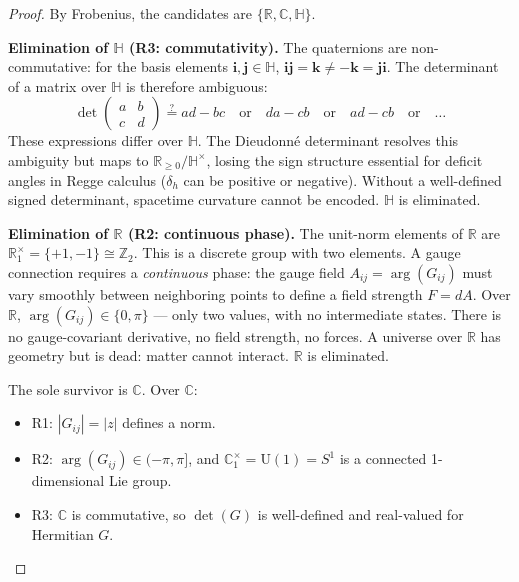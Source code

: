 \documentclass[12pt]{article}
\theoremstyle{remark}
\theoremstyle{definition}
\begin{document}
\begin{proof}
By Frobenius, the candidates are $\{\mathbb{R}, \mathbb{C}, \mathbb{H}\}$.

\medskip
\noindent\textbf{Elimination of $\mathbb{H}$ (R3: commutativity).}
The quaternions are non-commutative: for the basis elements $\mathbf{i}, \mathbf{j} \in \mathbb{H}$, $\mathbf{i}\mathbf{j} = \mathbf{k} \neq -\mathbf{k} = \mathbf{j}\mathbf{i}$. The determinant of a matrix over $\mathbb{H}$ is therefore ambiguous:
\begin{equation}
\det\begin{pmatrix} a & b \\ c & d \end{pmatrix} \stackrel{?}{=} ad - bc \quad\text{or}\quad da - cb \quad\text{or}\quad ad - cb \quad\text{or}\quad \ldots
\end{equation}
These expressions differ over $\mathbb{H}$. The Dieudonn\'e determinant resolves this ambiguity but maps to $\mathbb{R}_{\geq 0}/\mathbb{H}^\times$, losing the sign structure essential for deficit angles in Regge calculus ($\delta_h$ can be positive or negative). Without a well-defined signed determinant, spacetime curvature cannot be encoded. $\mathbb{H}$ is eliminated.

\medskip
\noindent\textbf{Elimination of $\mathbb{R}$ (R2: continuous phase).}
The unit-norm elements of $\mathbb{R}$ are $\mathbb{R}^\times_1 = \{+1, -1\} \cong \mathbb{Z}_2$. This is a discrete group with two elements. A gauge connection requires a \emph{continuous} phase: the gauge field $A_{ij} = \arg(G_{ij})$ must vary smoothly between neighboring points to define a field strength $F = dA$. Over $\mathbb{R}$, $\arg(G_{ij}) \in \{0, \pi\}$ --- only two values, with no intermediate states. There is no gauge-covariant derivative, no field strength, no forces. A universe over $\mathbb{R}$ has geometry but is dead: matter cannot interact. $\mathbb{R}$ is eliminated.

\medskip
The sole survivor is $\mathbb{C}$. Over $\mathbb{C}$:
\begin{itemize}
\item R1: $|G_{ij}| = |z|$ defines a norm. \checkmark
\item R2: $\arg(G_{ij}) \in (-\pi, \pi]$, and $\mathbb{C}^\times_1 = \text{U}(1) = S^1$ is a connected 1-dimensional Lie group. \checkmark
\item R3: $\mathbb{C}$ is commutative, so $\det(G)$ is well-defined and real-valued for Hermitian $G$. \checkmark \qedhere
\end{itemize}
\end{proof}
\end{document}
